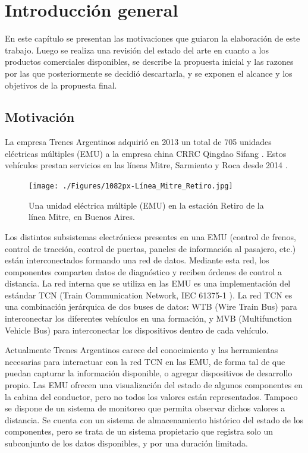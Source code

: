 \chapter{Introducción general}

En este capítulo se presentan las motivaciones que guiaron la elaboración de este trabajo. Luego se realiza una revisión del estado del arte en cuanto a los productos comerciales disponibles, se describe la propuesta inicial y las razones por las que posteriormente se decidió descartarla, y se exponen el alcance y los objetivos de la propuesta final.

\label{cap:IntroGeneral}

\section{Motivación}

La empresa Trenes Argentinos \cite{web:sofse} adquirió en 2013 un total de 705 unidades eléctricas múltiples (EMU) a la empresa china CRRC Qingdao Sifang \cite{web:sifang} \cite{licitacion1}. Estos vehículos prestan servicios en las líneas Mitre, Sarmiento y Roca desde 2014 \cite{emu:roca} \cite{emu:mitre-sarmiento}.

\begin{figure}[htbp]
	\centering
	\texttt{[image: ./Figures/1082px-Línea\_Mitre\_Retiro.jpg]}
	\caption[Unidad eléctrica múltiple (EMU)]{Una unidad eléctrica múltiple (EMU) en la estación Retiro de la línea Mitre, en Buenos Aires.\footnotemark}
	\label{fig:emu}
\end{figure}

Los distintos subsistemas electrónicos presentes en una EMU (control de frenos, control de tracción, control de puertas, paneles de información al pasajero, etc.) están interconectados formando una red de datos. Mediante esta red, los componentes comparten datos de diagnóstico y reciben órdenes de control a distancia. La red interna que se utiliza en las EMU es una implementación del estándar TCN (Train Communication Network, IEC 61375-1 \cite{iec61375-1}). La red TCN es una combinación jerárquica de dos buses de datos: WTB (Wire Train Bus) para interconectar los diferentes vehículos en una formación, y MVB (Multifunction Vehicle Bus) para interconectar los dispositivos dentro de cada vehículo.

Actualmente Trenes Argentinos carece del conocimiento y las herramientas necesarias para interactuar con la red TCN en las EMU, de forma tal de que puedan capturar la información disponible, o agregar dispositivos de desarrollo propio.
Las EMU ofrecen una visualización del estado de algunos componentes en la cabina del conductor, pero no todos los valores están representados.
Tampoco se dispone de un sistema de monitoreo que permita observar dichos valores a distancia.
Se cuenta con un sistema de almacenamiento histórico del estado de los componentes, pero se trata de un sistema propietario que registra solo un subconjunto de los datos disponibles, y por una duración limitada.

